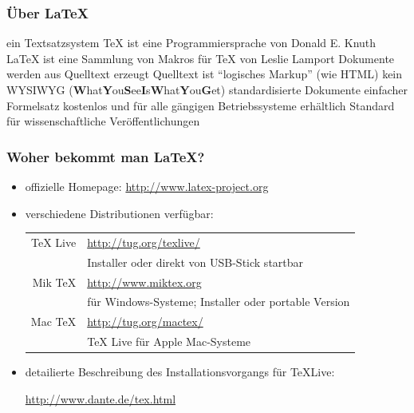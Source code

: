 
\begin{frame}
	\frametitle{Über \LaTeX}

	\begin{itemize}
		\itemra ein Textsatzsystem
        \itemra \TeX{} ist eine Programmiersprache von Donald E. Knuth
        \itemra \LaTeX{} ist eine Sammlung von Makros für \TeX{} von Leslie Lamport
		\itemra Dokumente werden aus Quelltext erzeugt
		\itemra Quelltext ist ``logisches Markup'' (wie HTML)
		\itemra kein WYSIWYG (\textbf What\textbf You\textbf See\textbf Is\textbf What\textbf You\textbf Get)
		\itemra standardisierte Dokumente
		\itemra einfacher Formelsatz
		\itemra kostenlos und für alle gängigen Betriebssysteme erhältlich
		\itemra Standard für wissenschaftliche Veröffentlichungen
	\end{itemize}
\end{frame}

\begin{frame}
	\frametitle{Woher bekommt man \LaTeX?}
	
	\begin{itemize}
		\item offizielle Homepage: \url{http://www.latex-project.org}
		\item verschiedene Distributionen verfügbar:
		\begin{center}
			\begin{tabular}{rl}
				{\TUgreen TeX Live} & \url{http://tug.org/texlive/} \\
					& Installer oder direkt von USB-Stick startbar\\
				{\TUgreen Mik TeX} & \url{http://www.miktex.org} \\
					& für Windows-Systeme; Installer oder portable Version\\
				{\TUgreen Mac TeX} & \url{http://tug.org/mactex/} \\
					& TeX Live für Apple Mac-Systeme
			\end{tabular}
		\end{center}
		\item detailierte Beschreibung des Installationsvorgangs für \TeX Live:
		\begin{center}
			\url{http://www.dante.de/tex.html}
		\end{center}
	\end{itemize}
\end{frame}

